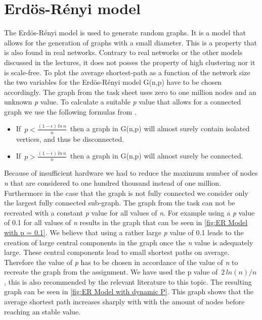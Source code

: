 \chapter{Erdös-Rényi model}
\label{cha: Erdös-Rényi model}
The Erdös-Rényi model is used to generate random graphs. It is a model that allows for the generation of graphs with a small diameter. This is a property that is also found in real networks. Contrary to real networks or the other models discussed in the lectures, it does not posses the property of high clustering nor it is scale-free. To plot the average shortest-path as a function of the network size the two variables for the Erdös-Rényi model G(n,p) have to be chosen accordingly. The graph from the task sheet uses zero to one million nodes and an unknown \textit{p} value. To calculate a suitable \textit{p} value that allows for a connected graph we use the following formulas from \cite{Erdos1984OnTE}.
\begin{itemize}
    \item If $ \,p < \frac{(1-\epsilon) \, ln \, n}{n} \,$ then a graph in G(n,p) will almost surely contain isolated vertices, and thus be disconnected.
    \item If $ \,p > \frac{(1-\epsilon) \, ln \, n}{n} \,$ then a graph in G(n,p) will almost surely be connected.
\end{itemize}
Because of insufficient hardware we had to reduce the maximum number of nodes \textit{n} that are considered to one hundred thousand instead of one million. Furthermore in the case that the graph is not fully connected we consider only the largest fully connected sub-graph. The graph from the task can not be recreated with a constant \textit{p} value for all values of \textit{n}. For example using a \textit{p} value of 0.1 for all values of \textit{n} results in the graph that can be seen in \ref{fig:ER Model with p = 0.1}.
We believe that using a rather large \textit{p} value of 0.1 leads to the creation of large central components in the graph once the \textit{n} value is adequately large. These central components lead to small shortest paths on average.
Therefore the value of \textit{p} has to be chosen in accordance of the value of \textit{n} to recreate the graph from the assignment. We have used the p value of $\,2\,ln(n)/n\,$, this is also recommended by the relevant literature to this topic. The resulting graph can be seen in \ref{fig:ER Model with dynamic P}. This graph shows that the average shortest path increases sharply with with the amount of nodes before reaching an stable value.
